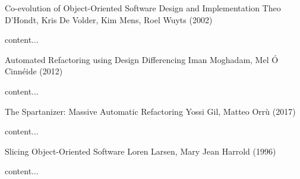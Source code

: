 \documentclass{beamer}
\begin{document}
\begin{frame}{Co-evolution of Object-Oriented Software Design and Implementation}
  {Theo D'Hondt, Kris De Volder, Kim Mens, Roel Wuyts (2002)}
  
  content...
\end{frame}

\begin{frame}{Automated Refactoring using Design Differencing}
  {Iman Moghadam, Mel Ó Cinnéide (2012)}
  
  content...
\end{frame}

\begin{frame}{The Spartanizer: Massive Automatic Refactoring}
  {Yossi Gil, Matteo Orrù (2017)}
  
  content...
\end{frame}

\begin{frame}{Slicing Object-Oriented Software}
  {Loren Larsen, Mary Jean Harrold (1996)}
  
  content...
\end{frame}

%  
%


\appendix
\section*{\appendixname}
\end{document}
